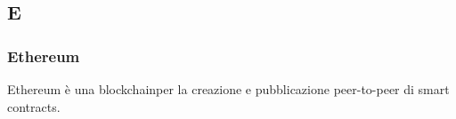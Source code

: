 \subsection*{\textbf{\hfill \Huge{E} \hfill}} 
\subsubsection*{Ethereum}
Ethereum è una blockchain\glo per la creazione e pubblicazione peer-to-peer di smart contracts\glo.